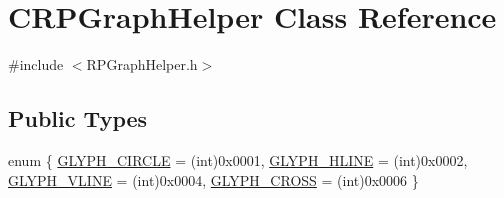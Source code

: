 \hypertarget{classCRPGraphHelper}{
\section{CRPGraphHelper Class Reference}
\label{classCRPGraphHelper}
}


{\ttfamily \#include $<$RPGraphHelper.h$>$}

\subsection*{Public Types}
\begin{DoxyCompactItemize}
\item 
enum \{ \hyperlink{classCRPGraphHelper_a4054fe21e25249c5231d6389e6ef33f0abda0fe6255de02197015cebe99893104}{GLYPH\_\-CIRCLE} =  (int)0x0001, 
\hyperlink{classCRPGraphHelper_a4054fe21e25249c5231d6389e6ef33f0a169df7a8e68fd8f9493d0e5d1febf245}{GLYPH\_\-HLINE} =  (int)0x0002, 
\hyperlink{classCRPGraphHelper_a4054fe21e25249c5231d6389e6ef33f0a6de07bdfbe53e2d8543939d94d5dd647}{GLYPH\_\-VLINE} =  (int)0x0004, 
\hyperlink{classCRPGraphHelper_a4054fe21e25249c5231d6389e6ef33f0a66e3a5c054bce56c5705115f21d26752}{GLYPH\_\-CROSS} =  (int)0x0006
 \}
\end{DoxyCompactItemize}
